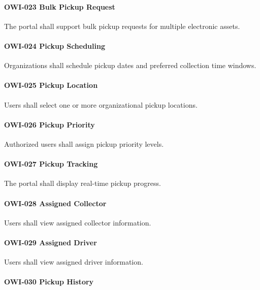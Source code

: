 \paragraph{OWI-023 Bulk Pickup Request}

The portal shall support bulk pickup requests for multiple electronic
assets.

\paragraph{OWI-024 Pickup Scheduling}

Organizations shall schedule pickup dates and preferred collection
time windows.

\paragraph{OWI-025 Pickup Location}

Users shall select one or more organizational pickup locations.

\paragraph{OWI-026 Pickup Priority}

Authorized users shall assign pickup priority levels.

\paragraph{OWI-027 Pickup Tracking}

The portal shall display real-time pickup progress.

\paragraph{OWI-028 Assigned Collector}

Users shall view assigned collector information.

\paragraph{OWI-029 Assigned Driver}

Users shall view assigned driver information.

\paragraph{OWI-030 Pickup History}

